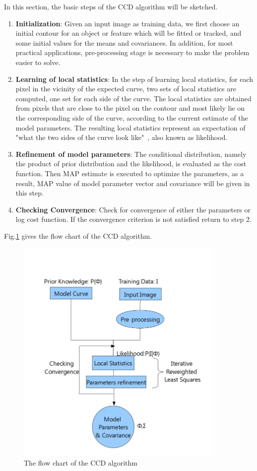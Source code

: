 In this section, the basic steps of the CCD algorithm will be
sketched. 
\begin{enumerate}
\item \textbf{Initialization}: Given an input image as training data, we first choose an initial
contour for an object or feature which will be fitted or tracked, and
some initial values for the means and covariances. In addition, for most practical
applications, 
pre-processing stage is necessary to make the problem easier to solve. 
\item \textbf{Learning of local statistics}: In the step of learning local
  statistics, for each pixel in the
vicinity of the expected curve, two sets of local statistics
are computed, one set for each side of the curve. The local statistics are obtained from
pixels that are close to the pixel on the contour and most likely lie
on the corresponding side of the curve, according to the current
estimate of the model parameters. The resulting local statistics
represent an expectation of "what the two sides of the curve look
like"~\cite{hanek2004contracting}, also known as likelihood.
\item \textbf{Refinement of model parameters}: The conditional distribution, namely
  the product of prior distribution and  the likelihood, is evaluated
  as the cost function. Then MAP estimate is executed to optimize the
  parameters, as a result, MAP value of model parameter vector and
  covariance will be given in this step.
\item \textbf{Checking Convergence}: Check for convergence of either
  the parameters or log cost function. If the convergence criterion is
  not satisfied return to step 2.
\end{enumerate}
Fig.\ref{fig:flowchart} gives the flow chart of the CCD algorithm.
\begin{figure}[htb]
  \centering
  \includegraphics[width=10cm]{images/flowchart.jpg}
  \caption[The flow chart of
  the CCD algorithm]{The flow chart of the CCD algorithm}
  \label{fig:flowchart}
\end{figure}


